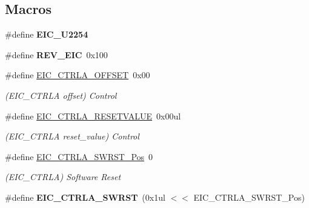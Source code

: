 \subsection*{Macros}
\begin{DoxyCompactItemize}
\item 
\hypertarget{group___s_a_m_l21___e_i_c_ga70894c5664f736a0b681a245a532f693}{}\#define {\bfseries E\+I\+C\+\_\+\+U2254}\label{group___s_a_m_l21___e_i_c_ga70894c5664f736a0b681a245a532f693}

\item 
\hypertarget{group___s_a_m_l21___e_i_c_ga903f62b04b916a92b23d16735a1569da}{}\#define {\bfseries R\+E\+V\+\_\+\+E\+I\+C}~0x100\label{group___s_a_m_l21___e_i_c_ga903f62b04b916a92b23d16735a1569da}

\item 
\hypertarget{group___s_a_m_l21___e_i_c_gab246344bc085e0c0c1f41f2c498d7a4e}{}\#define \hyperlink{group___s_a_m_l21___e_i_c_gab246344bc085e0c0c1f41f2c498d7a4e}{E\+I\+C\+\_\+\+C\+T\+R\+L\+A\+\_\+\+O\+F\+F\+S\+E\+T}~0x00\label{group___s_a_m_l21___e_i_c_gab246344bc085e0c0c1f41f2c498d7a4e}

\begin{DoxyCompactList}\small\item\em (E\+I\+C\+\_\+\+C\+T\+R\+L\+A offset) Control \end{DoxyCompactList}\item 
\hypertarget{group___s_a_m_l21___e_i_c_ga4fa956016182ca3fbb195313688e49b2}{}\#define \hyperlink{group___s_a_m_l21___e_i_c_ga4fa956016182ca3fbb195313688e49b2}{E\+I\+C\+\_\+\+C\+T\+R\+L\+A\+\_\+\+R\+E\+S\+E\+T\+V\+A\+L\+U\+E}~0x00ul\label{group___s_a_m_l21___e_i_c_ga4fa956016182ca3fbb195313688e49b2}

\begin{DoxyCompactList}\small\item\em (E\+I\+C\+\_\+\+C\+T\+R\+L\+A reset\+\_\+value) Control \end{DoxyCompactList}\item 
\hypertarget{group___s_a_m_l21___e_i_c_ga1a82937bd8157d38e7acd41ccdbb6c2c}{}\#define \hyperlink{group___s_a_m_l21___e_i_c_ga1a82937bd8157d38e7acd41ccdbb6c2c}{E\+I\+C\+\_\+\+C\+T\+R\+L\+A\+\_\+\+S\+W\+R\+S\+T\+\_\+\+Pos}~0\label{group___s_a_m_l21___e_i_c_ga1a82937bd8157d38e7acd41ccdbb6c2c}

\begin{DoxyCompactList}\small\item\em (E\+I\+C\+\_\+\+C\+T\+R\+L\+A) Software Reset \end{DoxyCompactList}\item 
\hypertarget{group___s_a_m_l21___e_i_c_gaece93aa95c587a3870482e4f6a6125f1}{}\#define {\bfseries E\+I\+C\+\_\+\+C\+T\+R\+L\+A\+\_\+\+S\+W\+R\+S\+T}~(0x1ul $<$$<$ E\+I\+C\+\_\+\+C\+T\+R\+L\+A\+\_\+\+S\+W\+R\+S\+T\+\_\+\+Pos)\label{group___s_a_m_l21___e_i_c_gaece93aa95c587a3870482e4f6a6125f1}


\end{DoxyCompactItemize}
